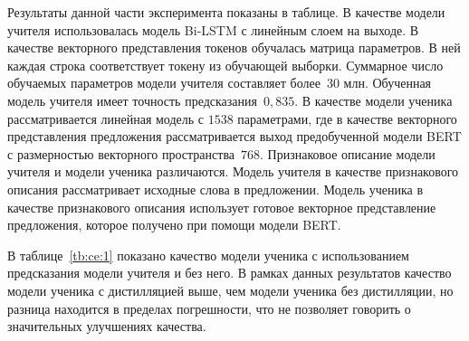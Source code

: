 Результаты данной части эксперимента показаны в таблице. В качестве модели учителя использовалась модель Bi-LSTM с линейным слоем на выходе. В качестве векторного представления токенов обучалась матрица параметров. В ней каждая строка соответствует токену из обучающей выборки. Суммарное число обучаемых параметров модели учителя составляет более~$30$ млн. Обученная модель учителя имеет точность предсказания~$0{,}835$. В качестве модели ученика рассматривается линейная модель с $1538$ параметрами, где в качестве векторного представления предложения рассматривается выход предобученной модели BERT с размерностью векторного пространства~$768$. Признаковое описание модели учителя и модели ученика различаются. Модель учителя в качестве признакового описания рассматривает исходные слова в предложении. Модель ученика в качестве признакового описания использует готовое векторное представление предложения, которое получено при помощи модели BERT.

В таблице~\ref{tb:ce:1} показано качество модели ученика с использованием предсказания модели учителя и без него. В рамках данных результатов качество модели ученика с дистилляцией выше, чем модели ученика без дистилляции, но разница находится в пределах погрешности, что не позволяет говорить о значительных улучшениях качества.

